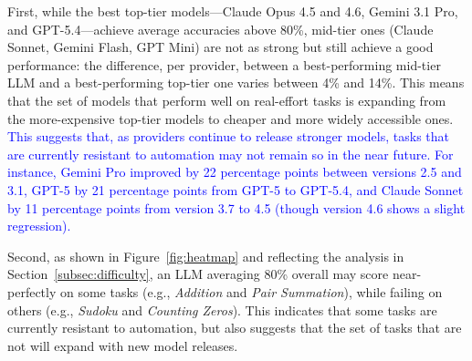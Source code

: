 \documentclass[12pt,a4paper]{article}
\newcommand{\blue}[1]{\textcolor{blue}{#1}}
\newcommand{\SC}[1]{\textcolor{violet}{SC: #1}}
\begin{document}
First, while the best top-tier models---Claude Opus 4.5 and 4.6, Gemini 3.1 Pro, and GPT-5.4---achieve average accuracies above 80\%, mid-tier ones (Claude Sonnet, Gemini Flash, GPT Mini) are not as strong but still achieve a good performance: the difference, per provider, between a best-performing mid-tier LLM and a best-performing top-tier one varies between 4\% and 14\%. This means that the set of models that perform well on real-effort tasks is expanding from the more-expensive top-tier models to cheaper and more widely accessible ones.
%
\blue{This suggests that, as providers continue to release stronger models, tasks that are currently resistant to automation may not remain so in the near future.
For instance,
Gemini Pro improved by 22 percentage points between versions 2.5 and 3.1, GPT-5 by 21 percentage points from GPT-5 to GPT-5.4, and Claude Sonnet by 11 percentage points from version 3.7 to 4.5 (though version 4.6 shows a slight regression).}

Second, as shown in Figure~\ref{fig:heatmap} and reflecting the analysis in Section~\ref{subsec:difficulty}, an LLM averaging 80\% overall may score near-perfectly on some tasks (e.g., \emph{Addition} and \emph{Pair Summation}), while failing on others (e.g., \emph{Sudoku} and \emph{Counting Zeros}). 
%
This indicates that some tasks are currently resistant to automation, but also suggests that the set of tasks that are not will expand with new model releases.


\end{document}
